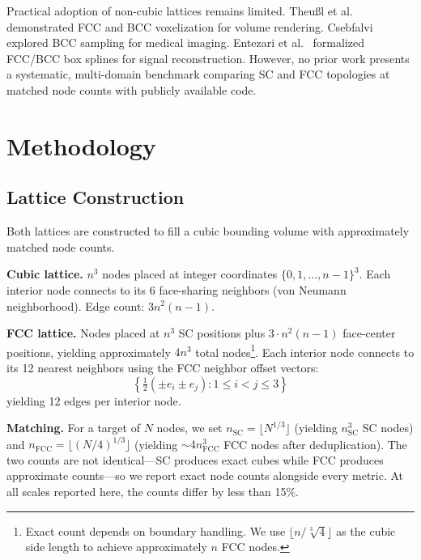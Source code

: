 \documentclass[11pt]{article}
\begin{document}
Practical adoption of non-cubic lattices remains limited.
Theu{\ss}l et al.~\cite{theussl2001} demonstrated FCC and BCC
voxelization for volume rendering. Csebfalvi~\cite{csebfalvi2010}
explored BCC sampling for medical imaging. Entezari et
al.~\cite{entezari2004} formalized FCC/BCC box splines for
signal reconstruction. However, no prior work presents a
systematic, multi-domain benchmark comparing SC and FCC topologies
at matched node counts with publicly available code.

\section{Methodology}
\label{sec:method}

\subsection{Lattice Construction}

Both lattices are constructed to fill a cubic bounding volume
with approximately matched node counts.

\textbf{Cubic lattice.} $n^3$ nodes placed at integer coordinates
$\{0, 1, \ldots, n{-}1\}^3$. Each interior node connects to its
6 face-sharing neighbors (von Neumann neighborhood). Edge count:
$3n^2(n-1)$.

\textbf{FCC lattice.} Nodes placed at $n^3$ SC positions plus
$3 \cdot n^2(n-1)$ face-center positions, yielding approximately
$4n^3$ total nodes\footnote{%
Exact count depends on boundary handling. We use
$\lfloor n/\sqrt[3]{4} \rfloor$ as the cubic side length to
achieve approximately $n$ FCC nodes.}. Each interior node connects
to its 12 nearest neighbors using the FCC neighbor offset vectors:
\begin{equation}
  \left\{\tfrac{1}{2}(\pm e_i \pm e_j) : 1 \leq i < j \leq 3\right\}
\end{equation}
yielding 12 edges per interior node.

\textbf{Matching.} For a target of $N$ nodes, we set
$n_{\mathrm{SC}} = \lfloor N^{1/3} \rfloor$ (yielding
$n_{\mathrm{SC}}^3$ SC nodes) and
$n_{\mathrm{FCC}} = \lfloor (N/4)^{1/3} \rfloor$ (yielding
${\sim}4 n_{\mathrm{FCC}}^3$ FCC nodes after deduplication).
The two counts are not identical---SC produces exact cubes while
FCC produces approximate counts---so we report exact node counts
alongside every metric. At all scales reported here, the counts
differ by less than 15\%.
\end{document}
